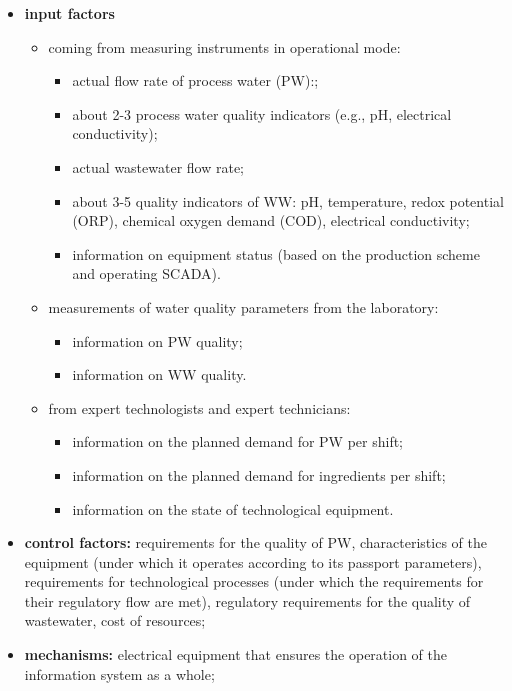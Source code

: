 \documentclass[a4paper]{article}
\begin{document}
\begin{multicols}{2}
\begin{itemize}[leftmargin=7mm]
    \item \textbf{input factors}
      \begin{itemize}[leftmargin=3.5mm]
      \item coming from measuring instruments in operational mode:
        \begin{itemize}[leftmargin=5.3mm]
            \item  actual flow rate of process water (PW):;
            \item  about 2-3 process water quality indicators
(e.g., pH, electrical conductivity);
            \item actual wastewater flow rate;
\item\nohyphens{ about 3-5 quality indicators of WW: pH, temperature, redox potential (ORP), chemical oxygen demand (COD), electrical conductivity;}
\item information on equipment status (based on the
production scheme and operating SCADA).
        \end{itemize}
        \item measurements of water quality parameters from
the laboratory:
\begin{itemize}[leftmargin=5.3mm]
\item information on PW quality;
\item information on WW quality.
\end{itemize}
\item from expert technologists and expert technicians:
\begin{itemize}[leftmargin=5.3mm]
\item information on the planned demand for PW
per shift;
\item \nohyphens{information on the planned demand for ingredients per shift;}
\item information on the state of technological
equipment.
\end{itemize}
      \end{itemize}
       \item\nohyphens{ \textbf{control factors:} requirements for the quality of PW,
characteristics of the equipment (under which it
operates according to its passport parameters), requirements for technological processes (under which
the requirements for their regulatory flow are met),
regulatory requirements for the quality of wastewater, cost of resources;}
 \item\nohyphens{ \textbf{mechanisms:} electrical equipment that ensures the
operation of the information system as a whole;}

\end{itemize}
\end{multicols}
\end{document}
